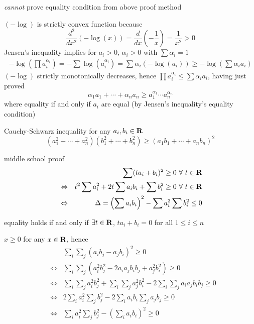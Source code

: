 \documentclass[17pt,landscape]{foils}
\begin{document}
\vitem \emph{cannot} prove equality condition from above proof method
\eit
{}
\bit
\item
$(-\log)$ is strictly convex function because
\[
\frac{d^2}{dx^2} \left(-\log(x)\right)
= \frac{d}{dx} \left(-\frac{1}{x} \right)
= \frac{1}{x^2} > 0
\]
\vitem
Jensen's inequality implies for $a_i >0$, $\alpha_i >0$ with $\sum \alpha_i = 1$
\begin{eqnarray*}
-\log\left(\prod a_i^{\alpha_i}\right)
= -\sum \log\left( a_i^{\alpha_i}\right)
=
\sum \alpha_i (-\log(a_i)) \geq -\log \left(\sum \alpha_i a_i\right)
\end{eqnarray*}
\vitem
$(-\log)$ strictly monotonically decreases, hence $\prod a_i^{\alpha_i} \leq \sum \alpha_i a_i$,
having just proved
\[
\alpha_1 a_1 + \cdots + \alpha_n a_n
\geq
a_1^{\alpha_1}\cdots a_n^{\alpha_n}
\]
where equality if and only if $a_i$ are equal
(by Jensen's inequality's equality condition)
\eit
{}
\begin{myinequality}{Cauchy-Schwarz inequality}
for any $a_i, b_i\in\mbox{\bf R}$
\[
( a_1^2 + \cdots + a_n^2 )
( b_1^2 + \cdots + b_n^2 )
\geq
(a_1b_1 + \cdots + a_nb_n)^2
\]
\end{myinequality}
\bit
\vitem middle school proof
\begin{eqnarray*}
&&\sum (t a_i + b_i)^2 \geq 0 \ \forall\ t \in \mbox{\bf R}
\\
&\Leftrightarrow&
t^2 \sum a_i^2 + 2t \sum a_ib_i + \sum b_i^2 \geq 0 \ \forall\ t \in \mbox{\bf R}
\\
&\Leftrightarrow&
\Delta = \left(\sum a_ib_i \right)^2 - \sum a_i^2 \sum b_i^2 \leq 0
\end{eqnarray*}
\bit
\item equality holds if and only if $\exists t\in\mbox{\bf R}$, $t a_i + b_i=0$ for all $1\leq i\leq n$
\eit
\eit
{}
\bit
\item $x\geq0$ for any $x\in\mbox{\bf R}$, hence
\begin{eqnarray*}
&&
\sum_i \sum_j (a_ib_j - a_jb_i)^2 \geq0
\\
&\Leftrightarrow&
\sum_i \sum_j (a_i^2b_j^2 - 2a_ia_jb_ib_j + a_j^2b_i^2) \geq0
\\
&\Leftrightarrow&
\sum_i \sum_j a_i^2b_j^2 + \sum_i \sum_j a_j^2b_i^2 -2 \sum_i \sum_j a_ia_jb_ib_j \geq 0
\\
&\Leftrightarrow&
2 \sum_i a_i^2 \sum_j b_j^2 - 2 \sum_i a_ib_i \sum_j a_jb_j \geq 0
\\
&\Leftrightarrow&
\sum_i a_i^2 \sum_j b_j^2 - \left(\sum_i a_ib_i\right)^2 \geq0
\end{eqnarray*}
\end{document}
